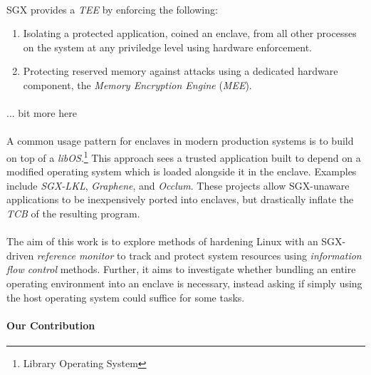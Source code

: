 \paragraph{} SGX provides a \textit{TEE} by enforcing the following:

\begin{enumerate}
    \item Isolating a protected application, coined an enclave, from all other processes on the system at any priviledge level using hardware enforcement.
    \item Protecting reserved memory against attacks using a dedicated hardware component, the \textit{Memory Encryption Engine} (\textit{MEE}). 
\end{enumerate}

\paragraph{} ... bit more here

\paragraph{} A common usage pattern for enclaves in modern production systems is to build on top of a \textit{libOS}.\footnote{Library Operating System} This approach sees a trusted application built to depend on a modified operating system which is loaded alongside it in the enclave. Examples include \textit{SGX-LKL}, \textit{Graphene}, and \textit{Occlum}. These projects allow SGX-unaware applications to be inexpensively ported into enclaves, but drastically inflate the \textit{TCB} of the resulting program.

\paragraph{} The aim of this work is to explore methods of hardening Linux with an SGX-driven \textit{reference monitor} to track and protect system resources using \textit{information flow control} methods. Further, it aims to investigate whether bundling an entire operating environment into an enclave is necessary, instead asking if simply using the host operating system could suffice for some tasks.


\paragraph{Our Contribution}

